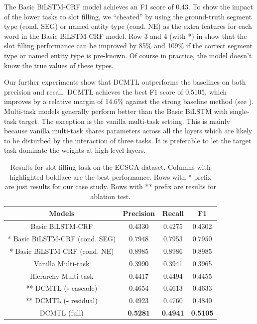 The Basic BiLSTM-CRF model achieves an F1 score of 0.43.
To show the impact of the lower tasks to slot filling,
we ``cheated'' by using the ground-truth segment type (cond. SEG) or 
named entity type (cond. NE) as the extra features for each word
in the Basic BiLSTM-CRF model.
Row 3 and 4 (with *) in  show that the slot filling 
performance can be improved by 85\% and 109\% if the correct segment type
or named entity type is pre-known.
Of course in practice, the model doesn't know the true values of these types.

Our further experiments show that DCMTL outperforms the 
baselines on both precision and recall.
DCMTL achieves the best F1 score of 0.5105, 
which improves by a relative margin of 14.6\% 
against the strong baseline method (see ).
Multi-task models generally perform better than the Basic 
BiLSTM with single-task target.
The exception is the vanilla multi-task setting.
This is mainly because 
vanilla multi-task shares parameters across all the layers
which are likely to be disturbed by the interaction of three tasks.
It is preferable to let the target task dominate the weights at 
high-level layers.
\begin{table}[htbp]
	\centering
	\caption{Results for slot filling task on the ECSGA dataset.
			Columns with highlighted boldface are the best performance.
			Rows with * prefix are just results for our case study.
			Rows with ** prefix are results for ablation test.}
	\label{tab:eval_ECSGA}
	\scriptsize
	\begin{tabular}{c|ccc}
		\toprule
		Models & Precision & Recall & F1 \\
		\midrule
		Basic BiLSTM-CRF & 0.4330 & 0.4275 & 0.4302 \\
		* Basic BiLSTM-CRF (cond. SEG) & 0.7948 & 0.7953 & 0.7950 \\
		* Basic BiLSTM-CRF (cond. NE) & 0.8985 & 0.8986 & 0.8985 \\
		\midrule
		Vanilla Multi-task & 0.3990 & 0.3941 & 0.3965 \\
		Hierarchy Multi-task & 0.4417 & 0.4494 & 0.4455 \\
		\midrule
		** DCMTL (\textbf{-} cascade) & 0.4654  & 0.4613 & 0.4633  \\
		** DCMTL (\textbf{-} residual) & 0.4923 & 0.4760 & 0.4840  \\
		DCMTL (full) & \textbf{0.5281} & \textbf{0.4941} & \textbf{0.5105} \\
		\bottomrule
	\end{tabular}
	\vspace{-10pt}
\end{table}

